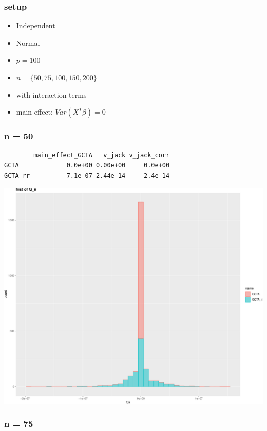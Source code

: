 \documentclass[]{article}
\providecommand{\tightlist}{%
  \setlength{\itemsep}{0pt}\setlength{\parskip}{0pt}}
\begin{document}
\subsubsection{setup}\label{setup-1}

\begin{itemize}
\tightlist
\item
  Independent
\item
  Normal
\item
  \(p = 100\)
\item
  \(n = \{50, 75,100, 150, 200\}\)
\item
  with interaction terms
\item
  main effect: \(Var(X^T\beta) = 0\) \newpage
\end{itemize}

\subsubsection{n = 50}\label{n-50-1}

\begin{verbatim}
        main_effect_GCTA   v_jack v_jack_corr
GCTA             0.0e+00 0.00e+00     0.0e+00
GCTA_rr          7.1e-07 2.44e-14     2.4e-14
\end{verbatim}

\includegraphics{GCTA_and_rr_v_jack_correction_files/figure-latex/unnamed-chunk-8-1.pdf}
\newpage

\subsubsection{n = 75}\label{n-75-1}
\end{document}

